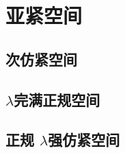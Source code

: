 \documentclass[main.tex]{subfiles}
\begin{document}
	
	
\chapter{亚紧空间}\label{ch5}
	
	\section{次仿紧空间}\label{sec:4.1}
	
	
	\section{$\lambda$完满正规空间}\label{sec:4.2}
	
	
	\section{正规	$\lambda$强仿紧空间}\label{sec:4.3}
	
\end{document}
